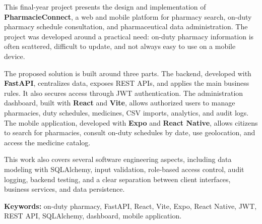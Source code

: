 This final-year project presents the design and implementation of \textbf{PharmacieConnect}, a web and
mobile platform for pharmacy search, on-duty pharmacy schedule consultation, and pharmaceutical data
administration. The project was developed around a practical need: on-duty pharmacy information is
often scattered, difficult to update, and not always easy to use on a mobile device.

The proposed solution is built around three parts. The backend, developed with \textbf{FastAPI}, centralizes
data, exposes REST APIs, and applies the main business rules. It also secures access through JWT
authentication. The administration dashboard, built with \textbf{React} and \textbf{Vite}, allows authorized
users to manage pharmacies, duty schedules, medicines, CSV imports, analytics, and audit logs. The
mobile application, developed with \textbf{Expo} and \textbf{React Native}, allows citizens to search for
pharmacies, consult on-duty schedules by date, use geolocation, and access the medicine catalog.

This work also covers several software engineering aspects, including data modeling with SQLAlchemy,
input validation, role-based access control, audit logging, backend testing, and a clear separation
between client interfaces, business services, and data persistence.

\textbf{Keywords:} on-duty pharmacy, FastAPI, React, Vite, Expo, React Native, JWT, REST API,
SQLAlchemy, dashboard, mobile application.
